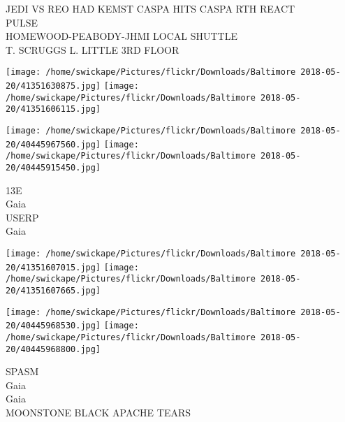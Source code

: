 \documentclass[10pt,letterpaper]{article}
\begin{document}
JEDI VS REO HAD KEMST CASPA HITS CASPA RTH REACT\\
PULSE\\
HOMEWOOD{-}PEABODY{-}JHMI LOCAL SHUTTLE\\
T. SCRUGGS L. LITTLE 3RD FLOOR
\pagebreak

\texttt{[image: /home/swickape/Pictures/flickr/Downloads/Baltimore 2018-05-20/41351630875.jpg]}
\texttt{[image: /home/swickape/Pictures/flickr/Downloads/Baltimore 2018-05-20/41351606115.jpg]}

\texttt{[image: /home/swickape/Pictures/flickr/Downloads/Baltimore 2018-05-20/40445967560.jpg]}
\texttt{[image: /home/swickape/Pictures/flickr/Downloads/Baltimore 2018-05-20/40445915450.jpg]}

13E\\
Gaia\\
USERP\\
Gaia
\pagebreak

\texttt{[image: /home/swickape/Pictures/flickr/Downloads/Baltimore 2018-05-20/41351607015.jpg]}
\texttt{[image: /home/swickape/Pictures/flickr/Downloads/Baltimore 2018-05-20/41351607665.jpg]}

\texttt{[image: /home/swickape/Pictures/flickr/Downloads/Baltimore 2018-05-20/40445968530.jpg]}
\texttt{[image: /home/swickape/Pictures/flickr/Downloads/Baltimore 2018-05-20/40445968800.jpg]}

SPASM\\
Gaia\\
Gaia\\
MOONSTONE BLACK APACHE TEARS
\pagebreak
\end{document}
